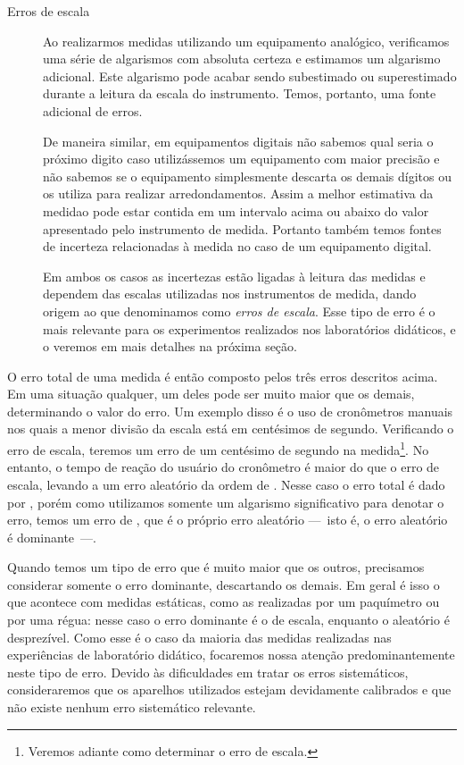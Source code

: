 \begin{description}
\item[Erros de escala] Ao realizarmos medidas utilizando um equipamento analógico, verificamos uma série de algarismos com absoluta certeza e estimamos um algarismo adicional. Este algarismo pode acabar sendo subestimado ou superestimado durante a leitura da escala do instrumento. Temos, portanto, uma fonte adicional de erros. 

De maneira similar, em equipamentos digitais não sabemos qual seria o próximo digito caso utilizássemos um equipamento com maior precisão e não sabemos se o equipamento simplesmente descarta os demais dígitos ou os utiliza para realizar arredondamentos. Assim a melhor estimativa da medidao pode estar contida em um intervalo acima ou abaixo do valor apresentado pelo instrumento de medida. Portanto também temos fontes de incerteza relacionadas à medida no caso de um equipamento digital.

Em ambos os casos as incertezas estão ligadas à leitura das medidas e dependem das escalas utilizadas nos instrumentos de medida, dando origem ao que denominamos como \emph{erros de escala}. Esse tipo de erro é o mais relevante para os experimentos realizados nos laboratórios didáticos, e o veremos em mais detalhes na próxima seção.
\end{description}

O erro total de uma medida é então composto pelos três erros descritos acima. Em uma situação qualquer, um deles pode ser muito maior que os demais, determinando o valor do erro. Um exemplo disso é o uso de cronômetros manuais nos quais a menor divisão da escala está em centésimos de segundo. Verificando o erro de escala, teremos um erro de um centésimo de segundo na medida\footnote{Veremos adiante como determinar o erro de escala.}. No entanto, o tempo de reação do usuário do cronômetro é maior do que o erro de escala, levando a um erro aleatório da ordem de . Nesse caso o erro total é dado por , porém como utilizamos somente um algarismo significativo para denotar o erro, temos um erro de , que é o próprio erro aleatório ---~isto é, o erro aleatório é dominante~---.

Quando temos um tipo de erro que é muito maior que os outros, precisamos considerar somente o erro dominante, descartando os demais. Em geral é isso o que acontece com medidas estáticas, como as realizadas por um paquímetro ou por uma régua: nesse caso o erro dominante é o de escala, enquanto o aleatório é desprezível. Como esse é o caso da maioria das medidas realizadas nas experiências de laboratório didático, focaremos nossa atenção predominantemente neste tipo de erro. Devido às dificuldades em tratar os erros sistemáticos, consideraremos que os aparelhos utilizados estejam devidamente calibrados e que não existe nenhum erro sistemático relevante.


